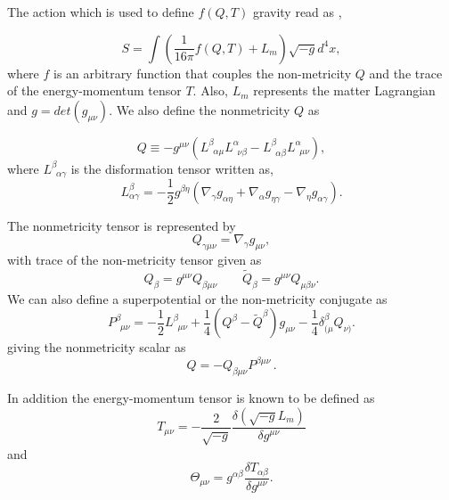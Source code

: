 The action which is used to define $f(Q,T)$ gravity read as \cite{Yixin/2019},

\begin{equation}  \label{1}
S=\int \left( \frac{1}{16\pi} f(Q,T) + L_{m}\right )\sqrt{-g} d^4x,
\end{equation}
where $f$ is an arbitrary function that couples the non-metricity $Q$ and the trace of the energy-momentum tensor $T$. Also, $L_{m}$ represents the matter Lagrangian and $g = det(g_{\mu \nu})$. We also define the nonmetricity $Q$ as \cite{Jimenez/2018}

\begin{equation}  \label{2}
Q\equiv -g^{\mu \nu}(L^{ \beta}_{\,\,\, \alpha \mu}L^{\alpha}_{\,\,\, \nu \beta}-L^{\beta}_{\,\,\, \alpha \beta}L^{\alpha}_{\,\,\, \mu \nu}),
\end{equation}
where $L^{\beta}_{\,\,\,  \alpha\gamma}$ is the disformation tensor written as, 
\begin{equation}  \label{3}
L^{\beta}_{\alpha\gamma}=-\frac{1}{2}g^{\beta\eta}(\nabla_{\gamma}g_{\alpha \eta}+\nabla_{\alpha}g_{\eta\gamma}-\nabla_{\eta}g_{\alpha \gamma}).
\end{equation}

The nonmetricity tensor is represented by
\begin{equation}
\label{4}
Q_{\gamma\mu\nu}=\nabla_{\gamma}g_{\mu\nu},
\end{equation}
with trace of the non-metricity tensor given as
\begin{equation}
\label{5}
Q_{\beta}= g^{\mu \nu}Q_{\beta \mu \nu}  \qquad \widetilde{Q}_{\beta}= g^{\mu \nu}Q_{\mu \beta \nu}.
\end{equation}
We can also define a superpotential or the non-metricity conjugate as
\begin{equation}
\label{6}
P^{\beta}_{\,\,\, \mu \nu}= -\frac{1}{2} L^{\beta}_{\,\,\, \mu \nu}+ \frac{1}{4} (Q^{\beta}- \widetilde{Q}^{\beta})g_{\mu \nu} - \frac{1}{4} \delta^{\beta}_{(\mu}Q_{\nu)}.
\end{equation}
giving the nonmetricity scalar as \cite{Jimenez/2018}
\begin{equation}
\label{7}
Q=-Q_{\beta\mu\nu}P^{\beta\mu\nu}\,.
\end{equation}

In addition the energy-momentum tensor is known to be defined as
\begin{equation}  \label{8}
T_{\mu \nu}= -\frac{2}{\sqrt{-g}} \dfrac{\delta(\sqrt{-g}L_{m})}{\delta g^{\mu \nu}}
\end{equation} 
and 
\begin{equation}   \label{9}
\Theta_{\mu \nu}= g^{\alpha \beta} \frac{\delta T_{\alpha \beta}}{\delta g^{\mu \nu}}.
\end{equation}

